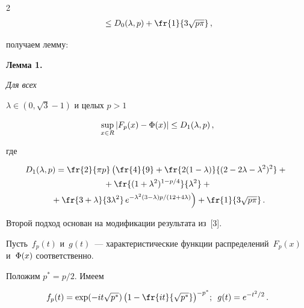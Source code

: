 \begin{multicols}{2}
\begin{multline*}
{}\le D_0(\lambda, p) + \fr{1}{3\sqrt{p \pi}}\,,

\end{multline*}

получаем лемму:



\smallskip



\noindent

\textbf{Лемма 1.} %

\textit{Для всех}

 $\lambda \in \left(0,\sqrt{3}-1\right)$  и целых $p >1$

\begin{equation*}

\sup\limits_{x \in R} |F_p(x) - \IP(x)| \le D_1(\lambda,p)\,,

\end{equation*}

где

\begin{multline*}

D_1(\lambda, p)= \fr{2}{\pi p}\left (\fr{4}{9} +\fr{2(1-\lambda)}{(2-2\lambda-\lambda^2)^2}

+{}\right.{}\\

{}+\fr{(1+\lambda^2)^{1-p/4}}{\lambda^2}+{}\\

\left.{}+\fr{3+\lambda}{3\lambda^2}\,

e^{-\lambda^2(3-\lambda)p/(12+4\lambda)} \right )

+ \fr{1}{3\sqrt{p \pi}}\,.

\end{multline*}



\smallskip



Второй подход основан на модификации результата из~[3].

Пусть~$f_p(t)$ и~$g(t)$~--- характеристические функции распределений~$F_p(x)$ и~$\mbox{$\Phi$}(x)$ соответственно.

Положим $p^*=p/2$. Имеем

\begin{equation*}

f_p(t) = \exp(-it \sqrt{p^*}) \left(1 -\fr{it}{\sqrt{p^*}}\right)^{-p^*}\!\,\!;\enskip

g(t) = e^{-t^2/2}\,.

\end{equation*}


\end{multicols}
